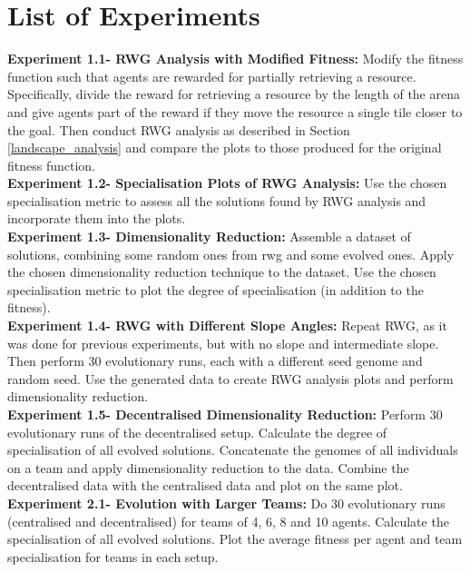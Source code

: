 \documentclass[12pt]{article}
\begin{document}
\section{List of Experiments}
\textbf{Experiment 1.1- RWG Analysis with Modified Fitness:}  Modify the fitness function such that agents are rewarded for partially retrieving a resource.
Specifically, divide the reward for retrieving a resource by the length of the arena and give agents part of the reward if they move the resource a single tile closer to the goal.
Then conduct RWG analysis as described in Section \ref{landscape_analysis} and compare the plots to those produced for the original fitness function.\\

\textbf{Experiment 1.2- Specialisation Plots of RWG Analysis:}  Use the chosen specialisation metric to assess all the solutions found by RWG analysis and incorporate them into the plots.\\

\textbf{Experiment 1.3- Dimensionality Reduction:} Assemble a dataset of solutions, combining some random ones from rwg and some evolved ones.
Apply the chosen dimensionality reduction technique to the dataset.
Use the chosen specialisation metric to plot the degree of specialisation (in addition to the fitness).\\

\textbf{Experiment 1.4- RWG with Different Slope Angles:} Repeat RWG, as it was done for previous experiments, but with no slope and intermediate slope.
Then perform 30 evolutionary runs, each with a different seed genome and random seed.
Use the generated data to create RWG analysis plots and perform dimensionality reduction.\\

\textbf{Experiment 1.5- Decentralised Dimensionality Reduction:} Perform 30 evolutionary runs of the decentralised setup.
Calculate the degree of specialisation of all evolved solutions.
Concatenate the genomes of all individuals on a team and apply dimensionality reduction to the data.
Combine the decentralised data with the centralised data and plot on the same plot.\\

\textbf{Experiment 2.1- Evolution with Larger Teams:} Do 30 evolutionary runs (centralised and decentralised) for teams of 4, 6, 8 and 10 agents.
Calculate the specialisation of all evolved solutions.
Plot the average fitness per agent and team specialisation for teams in each setup. \\
\end{document}
